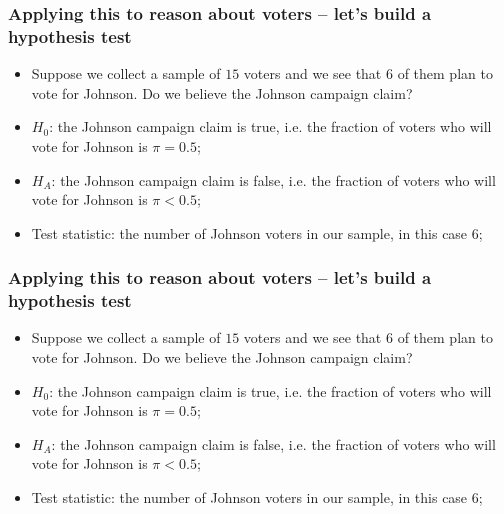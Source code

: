 \documentclass[aspectratio=169]{beamer}
\theoremstyle{principle}
\begin{document}
\begin{frame}
\frametitle{Applying this to reason about voters -- let's build a hypothesis test}

\begin{itemize}

\item Suppose we collect a sample of $15$ voters and we see that $6$ of them plan to vote for Johnson.  Do we believe the Johnson campaign claim?
\bigskip
\bigskip

\item $H_0$: \color{white}the Johnson campaign claim is true, i.e. the fraction of voters who will vote for Johnson is $\pi = 0.5$;
\bigskip
\bigskip

\item \color{black}$H_A$: \color{white}the Johnson campaign claim is false, i.e. the fraction of voters who will vote for Johnson is $\pi<0.5$;
\bigskip
\bigskip

\item \color{black}Test statistic: \color{white} the number of Johnson voters in our sample, in this case $6$;

\end{itemize}
\end{frame}

\begin{frame}
\frametitle{Applying this to reason about voters -- let's build a hypothesis test}

\begin{itemize}

\item Suppose we collect a sample of $15$ voters and we see that $6$ of them plan to vote for Johnson.  Do we believe the Johnson campaign claim?
\bigskip
\bigskip

\item $H_0$: the Johnson campaign claim is true, i.e. the fraction of voters who will vote for Johnson is $\pi = 0.5$;
\bigskip
\bigskip

\item $H_A$: the Johnson campaign claim is false, i.e. the fraction of voters who will vote for Johnson is $\pi<0.5$;
\bigskip
\bigskip

\item \color{black}Test statistic: \color{white} the number of Johnson voters in our sample, in this case $6$;

\end{itemize}
\end{frame}
\end{document}
